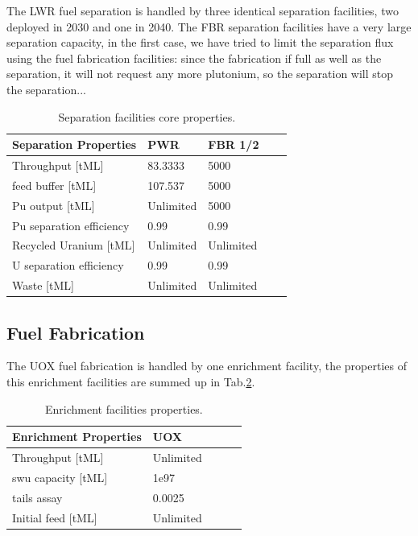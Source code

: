 \documentclass[12pt]{article}
\begin{document}
The LWR fuel separation is handled by three
identical separation facilities, two deployed in
2030 and one in 2040. The FBR separation
facilities have a very large separation capacity,
in the first case, we have tried to limit the
separation flux using the fuel fabrication
facilities: since the fabrication if full as well
as the separation, it will not request any more
plutonium, so the separation will stop the
separation...

\begin{table}[h!]
\centering
\begin{tabular}{lllll}
\hline
Separation Properties	&	PWR		&	FBR 1/2	\\
\hline
Throughput [tML]		&	83.3333	&	5000		\\
feed buffer [tML]		&	107.537	&	5000		\\
Pu output  [tML]		&	Unlimited	&	5000		\\
Pu separation efficiency	&	0.99		&	0.99		\\
Recycled Uranium [tML]	&	Unlimited	&	Unlimited	\\
U separation efficiency	&	0.99		&	0.99		\\
Waste [tML]			&	Unlimited	&	Unlimited	\\
\hline
\end{tabular}
\caption{Separation facilities core properties. }
\label{tab:separation_1}
\end{table}

\subsection{Fuel Fabrication}
The UOX fuel fabrication is handled by one
enrichment facility, the properties of this
enrichment facilities are summed up in
Tab.\ref{tab:enrich_1}.

\begin{table}[h!]
\centering
\begin{tabular}{lllll}
\hline
Enrichment Properties	&	UOX		\\
\hline
Throughput [tML]		&	Unlimited	\\
swu capacity [tML]		&	1e97		\\
tails assay  			&	0.0025	\\
Initial feed [tML]		&	Unlimited	\\
\hline
\end{tabular}
\caption{Enrichment facilities properties. }
\label{tab:enrich_1}
\end{table}
\end{document}
